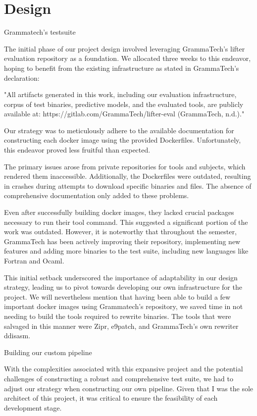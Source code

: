 \documentclass[a4paper,11pt,oneside]{report}
\begin{document}
\chapter{Design}

\setlength{\parindent}{4em}
Grammatech’s testsuite

The initial phase of our project design involved leveraging GrammaTech's lifter
evaluation repository as a foundation. We allocated three weeks to this endeavor, hoping to
benefit from the existing infrastructure as stated in GrammaTech's declaration:

"All artifacts generated in this work, including our evaluation infrastructure, corpus
of test binaries, predictive models, and the evaluated tools, are publicly available at:
https://gitlab.com/GrammaTech/lifter-eval (GrammaTech, n.d.)."

Our strategy was to meticulously adhere to the available documentation for
constructing each docker image using the provided Dockerfiles. Unfortunately, this
endeavor proved less fruitful than expected.

The primary issues arose from private repositories for tools and subjects, which
rendered them inaccessible. Additionally, the Dockerfiles were outdated, resulting in
crashes during attempts to download specific binaries and files. The absence of
comprehensive documentation only added to these problems.

Even after successfully building docker images, they lacked crucial packages
necessary to run their tool command. This suggested a significant portion of the work was
outdated. However, it is noteworthy that throughout the semester, GrammaTech has been
actively improving their repository, implementing new features and adding more binaries to
the test suite, including new languages like Fortran and Ocaml.

This initial setback underscored the importance of adaptability in our design
strategy, leading us to pivot towards developing our own infrastructure for the project. We
will nevertheless mention that having been able to build a few important docker images
using Grammatech’s repository, we saved time in not needing to build the tools required to
rewrite binaries. The tools that were salvaged in this manner were Zipr, e9patch, and
GrammaTech’s own rewriter ddisasm.

Building our custom pipeline

With the complexities associated with this expansive project and the potential
challenges of constructing a robust and comprehensive test suite, we had to adjust our
strategy when constructing our own pipeline. Given that I was the sole architect of this
project, it was critical to ensure the feasibility of each development stage.
\end{document}
